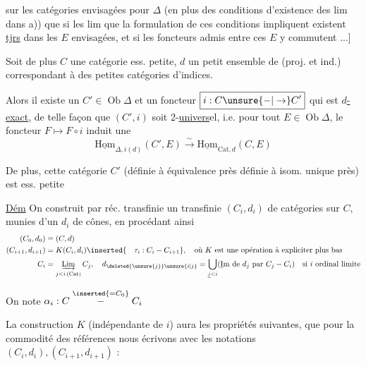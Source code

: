 
sur les catégories envisagées  pour $\Delta$ (en plus des conditions d'existence des lim dans a)) que si les  lim que la formulation de ces conditions impliquent existent \uline{tjrs} dans les $E$ envisagées, et si les foncteurs admis entre ces $E$ y commutent ...]

Soit de plus $C$ une catégorie ess. petite, $d$  un petit ensemble de   (proj. et ind.)  correspondant à des petites catégories d'indices.

Alors il existe un \uline{$C'\in\operatorname{Ob}\Delta$} et un foncteur $\boxed{i:C\unsure{-|\to}C'}$ qui est \uline{$d$-exact}, de telle façon que $(C',i)$ soit 2-\uline{univers}el, i.e. pour tout $E\in\operatorname{Ob}\Delta$, le foncteur $F\longmapsto F\circ i$ induit une 
\[
 \underline{\mathrm{Hom}}_{\Delta,i(d)}(C',E)\xrightarrow{\sim}\underline{\mathrm{Hom}}_{\mathrm{Cat},d}(C,E)
\]

De plus, cette catégorie $C'$ (définie à équivalence  près définie à isom. unique près) est ess. petite

\uline{Dém} On construit par réc. transfinie un   transfinie $(C_i,d_i)$ de catégories sur $C$, munies d'un $d_i$  de cônes, en procédant ainsi
\[
 \begin{aligned}
 (C_0,d_0)&=(C,d)\\
 (C_{i+1},d_{i+1})&=K(C_i,d_i)\inserted{\quad\tau_i:C_i-C_{i+1}},\quad\text{où }K\text{ est une opération à expliciter plus bas}\\
 C_i&=\underset{j<i\,(\mathrm{Cat})}{\underrightarrow{\mathrm{Lim}}}\,C_j,\quad
 d_{\deleted{\unsure{j}}\unsure{i|j}}=\bigcup_{\underline j<i}(\underline{\mathrm I}\mathrm m\text{ de }d_j\text{ par }C_j-C_i)
 \quad\text{si }i\text{ ordinal limite}
 \end{aligned}
\]

On note $\alpha_i:C\mathrel{\overset{\inserted{=C_0}}{-}}C_i$

La construction $K$ (indépendante de $i$) aura les propriétés suivantes, que pour la commodité des références nous écrivons avec les notations $(C_i,d_i),(C_{i+1},d_{i+1})$ :
